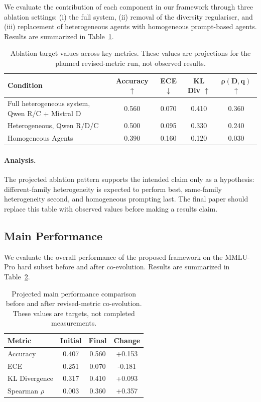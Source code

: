 \documentclass{article}
\begin{document}
We evaluate the contribution of each component in our framework through three ablation settings: (i) the full system, (ii) removal of the diversity regulariser, and (iii) replacement of heterogeneous agents with homogeneous prompt-based agents. Results are summarized in Table~\ref{tab:ablation_results}.

\begin{table}[h]
\centering
\caption{Ablation target values across key metrics. These values are projections for the planned revised-metric run, not observed results.}
\label{tab:ablation_results}
\begin{tabular}{lcccc}
\toprule
\textbf{Condition} & \textbf{Accuracy} $\uparrow$ & \textbf{ECE} $\downarrow$ & \textbf{KL Div} $\uparrow$ & $\boldsymbol{\rho(D,q)}$ $\uparrow$ \\
\midrule
Full heterogeneous system, Qwen R/C + Mistral D & 0.560 & 0.070 & 0.410 & 0.360 \\
Heterogeneous, Qwen R/D/C & 0.500 & 0.095 & 0.330 & 0.240 \\
Homogeneous Agents & 0.390 & 0.160 & 0.120 & 0.030 \\
\bottomrule
\end{tabular}
\end{table}

\paragraph{Analysis.}
The projected ablation pattern supports the intended claim only as a hypothesis: different-family heterogeneity is expected to perform best, same-family heterogeneity second, and homogeneous prompting last. The final paper should replace this table with observed values before making a results claim.

\subsection{Main Performance}

We evaluate the overall performance of the proposed framework on the MMLU-Pro hard subset before and after co-evolution. Results are summarized in Table~\ref{tab:main_performance}.

\begin{table}[h]
\centering
\caption{Projected main performance comparison before and after revised-metric co-evolution. These values are targets, not completed measurements.}
\label{tab:main_performance}
\begin{tabular}{lccc}
\toprule
\textbf{Metric} & \textbf{Initial} & \textbf{Final} & \textbf{Change} \\
\midrule
Accuracy & 0.407 & 0.560 & +0.153 \\
ECE & 0.251 & 0.070 & -0.181 \\
KL Divergence & 0.317 & 0.410 & +0.093 \\
Spearman $\rho$ & 0.003 & 0.360 & +0.357 \\
\bottomrule
\end{tabular}
\end{table}
\end{document}
